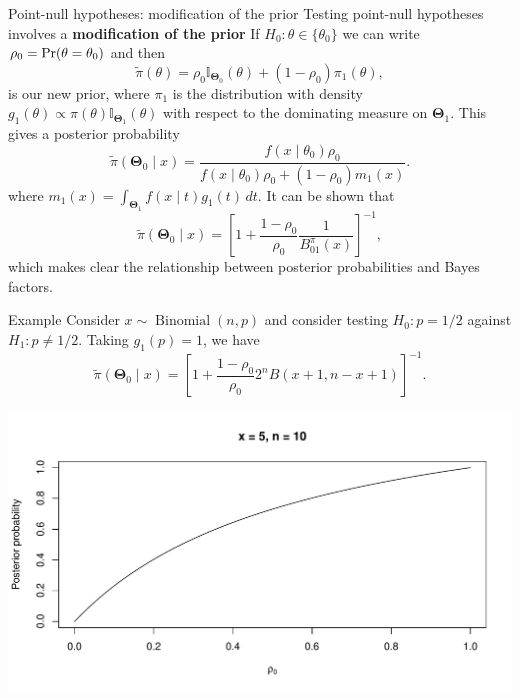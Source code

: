 \begin{frame}{Point-null hypotheses: modification of the prior}
Testing point-null hypotheses involves a \textbf{modification of the prior}
 If $H_0: \theta \in \{\theta_0\}$  we can write $\rho_0 = \operatorname{Pr}(\theta = \theta_0)$ and then
 \begin{equation*}
  \tilde{\pi}(\theta) = \rho_0 \mathbb{I}_{\boldsymbol{\Theta}_0}(\theta) + (1-\rho_0)\pi_1(\theta),
 \end{equation*}
is our new prior, where $\pi_1$ is the distribution with density $g_1(\theta) \propto \pi(\theta)\mathbb{I}_{\boldsymbol{\Theta}_1}(\theta)$ with respect to the dominating measure on $\boldsymbol{\Theta}_1$. 
This gives a posterior probability
\begin{equation*}
 \tilde{\pi}(\boldsymbol{\Theta}_0 \mid x) = \frac{f(x \mid \theta_0)\rho_0}{f(x \mid \theta_0)\rho_0 + (1-\rho_0)m_1(x)}.
\end{equation*}
where $m_1(x) = \int_{\boldsymbol{\Theta}_1} f(x \mid t)g_1(t)\,dt$.
It can be shown that
\begin{equation*}
 \tilde{\pi}(\boldsymbol{\Theta}_0 \mid x) = \left[1 + \frac{1-\rho_0}{\rho_0}\frac{1}{B^\pi_{01}(x)}\right]^{-1}, 
\end{equation*}
which makes clear the relationship between posterior probabilities and Bayes factors.
\end{frame}
\begin{frame}{Example}
Consider $x \sim \operatorname{Binomial}(n, p)$ and consider testing $H_0: p = 1/2$ against $H_1: p \neq 1/2$. 
Taking $g_1(p) = 1$, we have
\begin{equation*}
  \tilde{\pi}(\boldsymbol{\Theta}_0 \mid x) = \left[1 + \frac{1-\rho_0}{\rho_0}2^n B(x+1, n-x+1)\right]^{-1}.
\end{equation*}
 \begin{center}
 \includegraphics[scale=0.45]{figures/posterior_prob_half.pdf}
\end{center}
\end{frame}
